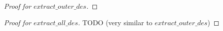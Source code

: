 \documentclass[11pt]{article} %
\begin{document}
\begin{proof}[Proof for $extract\_outer\_des$]
%
%

\end{proof}

\begin{proof}[Proof for $extract\_all\_des$]

TODO (very similar to $extract\_outer\_des$)

\end{proof}
\end{document}
